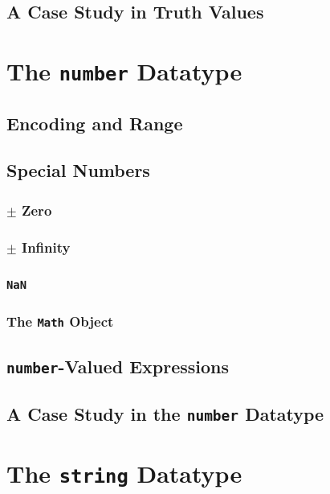 \documentclass[11pt,letter]{book}
\begin{document}
    \section{A Case Study in Truth Values}
    
    \chapter{The \texttt{number} Datatype}
    
    \section{Encoding and Range}
    
    \section{Special Numbers}
    
    \subsection{$\pm$ Zero}
    
    \subsection{$\pm$ Infinity}
    
    \subsection{\texttt{NaN}}
    
    \subsection{The \texttt{Math} Object}
    
    \section{\texttt{number}-Valued Expressions}
    
    \section{A Case Study in the \texttt{number} Datatype}
    
    \chapter{The \texttt{string} Datatype}
    
\end{document}
